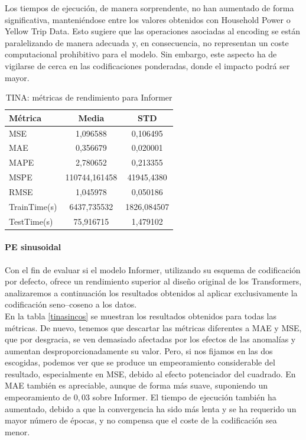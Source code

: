  Los tiempos de ejecución, de manera sorprendente, no han aumentado de forma significativa, manteniéndose entre los valores obtenidos con Household Power o Yellow Trip Data. Esto sugiere que las operaciones asociadas al encoding se están paralelizando de manera adecuada y, en consecuencia, no representan un coste computacional prohibitivo para el modelo. Sin embargo, este aspecto ha de vigilarse de cerca en las codificaciones ponderadas, donde el impacto podrá ser mayor.

\begin{table}[!ht]
	\centering
	\begin{tabular}{l|c|c}
		\toprule
		Métrica & Media & STD \\
		\midrule
		MSE & 1,096588 & 0,106495 \\
		MAE & 0,356679 & 0,020001 \\
		MAPE & 2,780652 & 0,213355 \\
		MSPE & 110744,161458 & 41945,4380 \\
		RMSE & 1,045978 & 0,050186 \\
		TrainTime(s) & 6437,735532 & 1826,084507 \\
		TestTime(s) & 75,916715 & 1,479102 \\
		\bottomrule
	\end{tabular}
	\caption{TINA: métricas de rendimiento para Informer}
	\label{tinainformer}
\end{table}

\paragraph{PE sinusoidal}

Con el fin de evaluar si el modelo Informer, utilizando su esquema de codificación por defecto, ofrece un rendimiento superior al diseño original de los Transformers, analizaremos a continuación los resultados obtenidos al aplicar exclusivamente la codificación seno–coseno a los datos.\\

En la tabla \ref{tinasincos} se muestran los resultados obtenidos para todas las métricas. De nuevo, tenemos que descartar las métricas diferentes a MAE y MSE, que por desgracia, se ven demasiado afectadas por los efectos de las anomalías y aumentan desproporcionadamente su valor. Pero, si nos fijamos en las dos escogidas, podemos ver que se produce un empeoramiento considerable del resultado, especialmente en MSE, debido al efecto potenciador del cuadrado. En MAE también es apreciable, aunque de forma más suave, suponiendo un empeoramiento de $0,03$ sobre Informer. El tiempo de ejecución también ha aumentado, debido a que la convergencia ha sido más lenta y se ha requerido un mayor número de épocas, y no compensa que el coste de la codificación sea menor.

